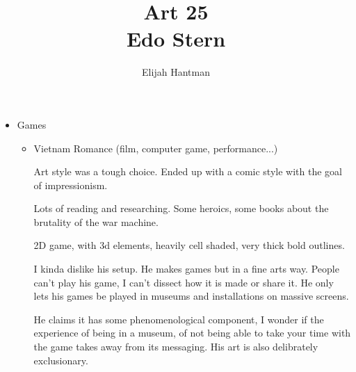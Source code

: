 \documentclass{report}
\title{\Huge{Art 25}\\Edo Stern}
\author{\huge{Elijah Hantman}}
\date{}
\begin{document}
\maketitle
\newpage

\begin{itemize}
    \item {\large Games}
        \begin{itemize}
            \item Vietnam Romance (film, computer game, performance...)
                \begin{mdframed}
                    Art style was a tough choice. Ended up with a 
                    comic style with the goal of impressionism.
                \end{mdframed}
                \begin{mdframed}
                    Lots of reading and researching. Some heroics,
                    some books about the brutality of the war machine.
                \end{mdframed}
                \begin{mdframed}
                    2D game, with 3d elements, heavily cell shaded, very
                    thick bold outlines.
                \end{mdframed}

                \begin{mdframed}
                    I kinda dislike his setup. He makes games but in a
                    fine arts way. People can't play his game, I can't
                    dissect how it is made or share it. He only lets
                    his games be played in museums and installations
                    on massive screens.

                    He claims it has some phenomenological component,
                    I wonder if the experience of being in a museum,
                    of not being able to take your time with the game
                    takes away from its messaging. His art is also
                    delibrately exclusionary.


\end{mdframed}
\end{itemize}
\end{itemize}
\end{document}
